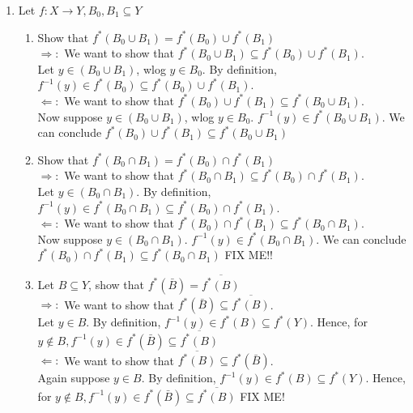 \documentclass[11pt]{article}
\begin{document}
\begin{enumerate}
\begin{enumerate}

\end{enumerate} %
\newpage

\item Let $f : X \to Y, B_0, B_1 \subseteq Y$
\begin{enumerate}
\item Show that $f^*(B_0 \cup B_1) = f^*(B_0) \cup f^*(B_1)$
\\
$\Rightarrow:$  We want to show that $f^*(B_0 \cup B_1) \subseteq f^*(B_0) \cup f^*(B_1)$.\\
Let $y \in (B_0 \cup B_1)$, wlog $y \in B_0$.  By definition, $f^{-1}(y) \in f^*(B_0) \subseteq f^*(B_0) \cup f^*(B_1)$. 
\\
$\Leftarrow:$ We want to show that $f^*(B_0) \cup f^*(B_1) \subseteq f^*(B_0 \cup B_1)$.
\\
Now suppose $y \in (B_0 \cup B_1)$, wlog $y \in B_0$.  $f^{-1}(y) \in f^*(B_0 \cup B_1)$.  We can conclude $f^*(B_0) \cup f^*(B_1) \subseteq f^*(B_0 \cup B_1)$
\item Show that $f^*(B_0 \cap B_1) = f^*(B_0) \cap f^*(B_1)$
\\
$\Rightarrow:$  We want to show that $f^*(B_0 \cap B_1) \subseteq f^*(B_0) \cap f^*(B_1)$.\\
Let $y \in (B_0 \cap B_1)$.  By definition, $f^{-1}(y) \in f^*(B_0 \cap B_1) \subseteq f^*(B_0) \cap f^*(B_1)$. 
\\
$\Leftarrow:$ We want to show that $f^*(B_0) \cap f^*(B_1) \subseteq f^*(B_0 \cap B_1)$.
\\
Now suppose $y \in (B_0 \cap B_1)$.  $f^{-1}(y) \in f^*(B_0 \cap B_1)$.  We can conclude $f^*(B_0) \cap f^*(B_1) \subseteq f^*(B_0 \cap B_1)$  FIX ME!!
\item Let $B \subseteq Y$, show that $f^*(\bar{B}) = \overline{f^*(B)}$\\
$\Rightarrow:$  We want to show that $f^*(\bar{B}) \subseteq \overline{f^*(B)}$.\\
Let $y \in B$.  By definition, $f^{-1}(y) \in f^*(B) \subseteq f^*(Y)$.  Hence, for $y \notin B, f^{-1}(y) \in f^*(\bar{B}) \subseteq \overline{f^*(B)}$
\\
$\Leftarrow:$ We want to show that $\overline{f^*(B)} \subseteq f^*(\bar{B})$.
\\
Again suppose $y \in B$.  By definition, $f^{-1}(y) \in f^*(B) \subseteq f^*(Y)$.  Hence, for $y \notin B, f^{-1}(y) \in f^*(\bar{B}) \subseteq \overline{f^*(B)}$  FIX ME!


\end{enumerate}
\end{enumerate}
\end{document}
